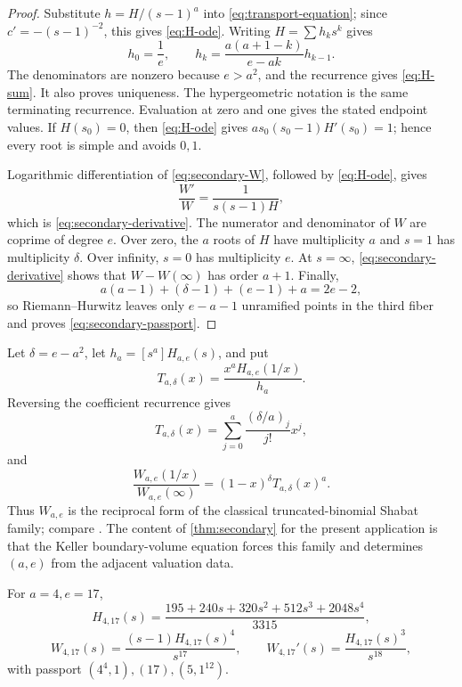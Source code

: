 \documentclass[11pt,reqno]{amsart}
\begin{document}
\begin{proof}
Substitute \(h=H/(s-1)^a\) into
\eqref{eq:transport-equation}; since \(c'=-(s-1)^{-2}\), this gives
\eqref{eq:H-ode}.  Writing \(H=\sum h_ks^k\) gives
\[
h_0=\frac1e,\qquad
h_k=\frac{a(a+1-k)}{e-ak}h_{k-1}.
\]
The denominators are nonzero because \(e>a^2\), and the recurrence gives
\eqref{eq:H-sum}.  It also proves uniqueness.  The hypergeometric notation
is the same terminating recurrence.  Evaluation at zero and one gives the
stated endpoint values.  If \(H(s_0)=0\), then
\eqref{eq:H-ode} gives \(as_0(s_0-1)H'(s_0)=1\); hence every root is simple
and avoids \(0,1\).

Logarithmic differentiation of \eqref{eq:secondary-W}, followed by
\eqref{eq:H-ode}, gives
\[
\frac{W'}W=\frac1{s(s-1)H},
\]
which is \eqref{eq:secondary-derivative}.  The numerator and denominator of
\(W\) are coprime of degree \(e\).  Over zero, the \(a\) roots of \(H\)
have multiplicity \(a\) and \(s=1\) has multiplicity \(\delta\).  Over
infinity, \(s=0\) has multiplicity \(e\).  At \(s=\infty\),
\eqref{eq:secondary-derivative} shows that
\(W-W(\infty)\) has order \(a+1\).  Finally,
\[
a(a-1)+(\delta-1)+(e-1)+a=2e-2,
\]
so Riemann--Hurwitz leaves only \(e-a-1\) unramified points in the third
fiber and proves \eqref{eq:secondary-passport}.
\end{proof}


\begin{remark}
Let \(\delta=e-a^2\), let \(h_a=[s^a]H_{a,e}(s)\), and put
\[
 T_{a,\delta}(x)=\frac{x^aH_{a,e}(1/x)}{h_a}.
\]
Reversing the coefficient recurrence gives
\[
 T_{a,\delta}(x)=
 \sum_{j=0}^a\frac{(\delta/a)_j}{j!}x^j,
\]
and
\[
 \frac{W_{a,e}(1/x)}{W_{a,e}(\infty)}
 =(1-x)^\delta T_{a,\delta}(x)^a.
\]
Thus \(W_{a,e}\) is the reciprocal form of the classical
truncated-binomial Shabat family; compare \cite{vidunas2025belyi}.  The
content of \cref{thm:secondary} for the present application is that the
Keller boundary-volume equation forces this family and determines
\((a,e)\) from the adjacent valuation data.
\end{remark}

\begin{corollary}
\label{cor:417}
For \(a=4,e=17\),
\[
H_{4,17}(s)
=\frac{195+240s+320s^2+512s^3+2048s^4}{3315},
\]
\[
W_{4,17}(s)=\frac{(s-1)H_{4,17}(s)^4}{s^{17}},
\qquad
W_{4,17}'(s)=\frac{H_{4,17}(s)^3}{s^{18}},
\]
with passport \((4^4,1),(17),(5,1^{12})\).
\end{corollary}
\end{document}
